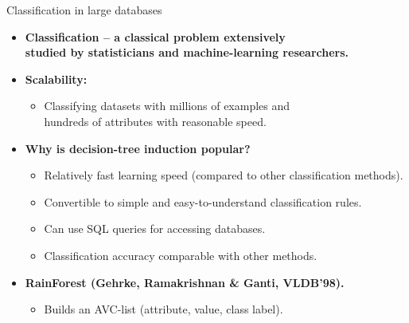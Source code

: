 \documentclass[aspectratio=169,t,table]{beamer}
\begin{document}
  {
    \begin{frame}{Classification in large databases}
      \begin{itemize}
        \item \textbf{Classification -- a classical problem extensively \\ studied by statisticians and machine-learning researchers.}
        \item \textbf{Scalability:}
        \begin{itemize}
          \item Classifying datasets with millions of examples and \\ hundreds of attributes with reasonable speed.
        \end{itemize}
        \item \textbf{Why is decision-tree induction popular?}
        \begin{itemize}
          \item Relatively fast learning speed (compared to other classification methods).
          \item Convertible to simple and easy-to-understand classification rules.
          \item Can use SQL queries for accessing databases.
          \item Classification accuracy comparable with other methods.
        \end{itemize}
        \item \textbf{RainForest (Gehrke, Ramakrishnan \& Ganti, VLDB'98).}
        \begin{itemize}
          \item Builds an AVC-list (attribute, value, class label).
        \end{itemize}
      \end{itemize}
    \end{frame}
  }
\end{document}
